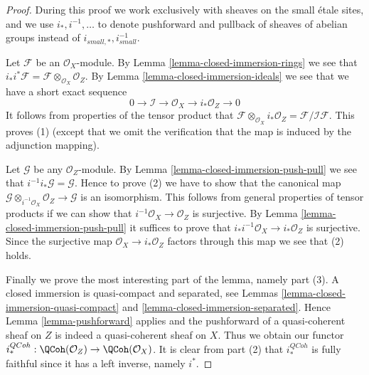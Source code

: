 \begin{proof}
During this proof we work exclusively with sheaves on
the small \'etale sites, and we use $i_*, i^{-1}, \ldots$
to denote pushforward and pullback of sheaves of abelian groups
instead of $i_{small, *}, i_{small}^{-1}$.

\medskip\noindent
Let $\mathcal{F}$ be an $\mathcal{O}_X$-module. By
Lemma \ref{lemma-closed-immersion-rings}
we see that
$i_*i^*\mathcal{F} = \mathcal{F} \otimes_{\mathcal{O}_X} \mathcal{O}_Z$.
By
Lemma \ref{lemma-closed-immersion-ideals}
we see that we have a short exact sequence
$$
0 \to \mathcal{I} \to \mathcal{O}_X \to i_*\mathcal{O}_Z \to 0
$$
It follows from properties of the tensor product that
$\mathcal{F} \otimes_{\mathcal{O}_X} i_*\mathcal{O}_Z
= \mathcal{F}/\mathcal{I}\mathcal{F}$. This proves (1) (except
that we omit the verification that the map is induced by the
adjunction mapping).

\medskip\noindent
Let $\mathcal{G}$ be any $\mathcal{O}_Z$-module. By
Lemma \ref{lemma-closed-immersion-push-pull}
we see that $i^{-1}i_*\mathcal{G} = \mathcal{G}$.
Hence to prove (2) we have to show that the canonical map
$\mathcal{G} \otimes_{i^{-1}\mathcal{O}_X} \mathcal{O}_Z \to \mathcal{G}$
is an isomorphism. This follows from general properties of tensor products
if we can show that $i^{-1}\mathcal{O}_X \to \mathcal{O}_Z$ is surjective. By
Lemma \ref{lemma-closed-immersion-push-pull}
it suffices to prove that
$i_*i^{-1}\mathcal{O}_X \to i_*\mathcal{O}_Z$
is surjective. Since the surjective map $\mathcal{O}_X \to i_*\mathcal{O}_Z$
factors through this map we see that (2) holds.

\medskip\noindent
Finally we prove the most interesting part of the lemma, namely part (3).
A closed immersion is quasi-compact and separated, see
Lemmas \ref{lemma-closed-immersion-quasi-compact} and
\ref{lemma-closed-immersion-separated}. Hence
Lemma \ref{lemma-pushforward}
applies and the pushforward of a quasi-coherent
sheaf on $Z$ is indeed a quasi-coherent sheaf on $X$.
Thus we obtain our functor
$i^{QCoh}_* : \QCoh(\mathcal{O}_Z)
\to \QCoh(\mathcal{O}_X)$.
It is clear from part (2) that $i^{QCoh}_*$ is fully faithful since
it has a left inverse, namely $i^*$.


\end{proof}
